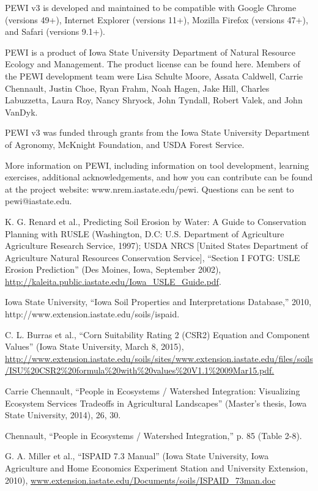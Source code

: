 \documentclass[11pt]{article}
\begin{document}
\begin{itemize}
PEWI v3 is developed and maintained to be compatible with Google Chrome (versions 49+), Internet Explorer (versions 11+), Mozilla Firefox (versions 47+), and Safari (versions 9.1+).

PEWI is a product of Iowa State University Department of Natural Resource Ecology and Management. The product license can be found here. Members of the PEWI development team were Lisa Schulte Moore, Assata Caldwell, Carrie Chennault, Justin Choe, Ryan Frahm, Noah Hagen, Jake Hill, Charles Labuzzetta, Laura Roy, Nancy Shryock, John Tyndall, Robert Valek, and John VanDyk.

PEWI v3 was funded through grants from the Iowa State University Department of Agronomy, McKnight Foundation, and USDA Forest Service.

More information on PEWI, including information on tool development, learning exercises, additional acknowledgements, and how you can contribute can be found at the project website: www.nrem.iastate.edu/pewi. Questions can be sent to pewi@iastate.edu. 
\begin{thebibliography}{1}

   K. G. Renard et al., Predicting Soil Erosion by Water: A Guide to Conservation Planning with RUSLE (Washington, D.C: U.S. Department of Agriculture Agriculture Research Service, 1997); USDA NRCS [United States Department of Agriculture Natural Resources Conservation Service], “Section I FOTG: USLE Erosion Prediction” (Des Moines, Iowa, September 2002), \url{http://kaleita.public.iastate.edu/Iowa_USLE_Guide.pdf}.
  
  Iowa State University, “Iowa Soil Properties and Interpretations Database,” 2010, http://www.extension.iastate.edu/soils/ispaid.
  
  C. L. Burras et al., “Corn Suitability Rating 2 (CSR2) Equation and Component Values” (Iowa State University, March 8, 2015), \url{http://www.extension.iastate.edu/soils/sites/www.extension.iastate.edu/files/soils/ISU\%20CSR2\%20formula\%20with\%20values\%20V1.1\%2009Mar15.pdf.}
  
  Carrie Chennault, “People in Ecosystems / Watershed Integration: Visualizing Ecosystem Services Tradeoffs in Agricultural Landscapes” (Master’s thesis, Iowa State University, 2014), 26, 30.
  
  Chennault, “People in Ecosystems / Watershed Integration,” p. 85 (Table 2-8).
  
  G. A. Miller et al., “ISPAID 7.3 Manual” (Iowa State University, Iowa Agriculture and Home Economics Experiment Station and University Extension, 2010), \url{www.extension.iastate.edu/Documents/soils/ISPAID_73man.doc}
  

\end{thebibliography}
\end{itemize}
\end{document}
